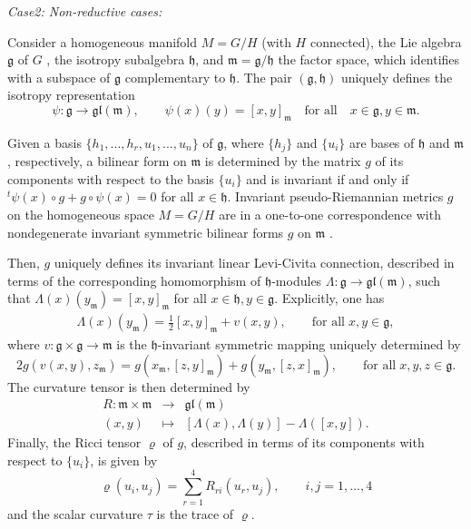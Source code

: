\documentclass[11pt,oneside,leqno]{amsart}
\theoremstyle{plain}
\begin{document}
{\em Case2: Non-reductive cases:}

Consider a homogeneous manifold $M=G/H$ (with $H$ connected), the Lie algebra ${{\mathfrak{g}}}$ of $G$ ,  the isotropy subalgebra ${{\mathfrak{h}}}$, and ${{\mathfrak{m}}} = {{\mathfrak{g}}} /{{\mathfrak{h}}}$ the factor space, which identifies with a subspace of ${{\mathfrak{g}}}$ complementary to ${{\mathfrak{h}}}$. The pair $({{\mathfrak{g}}}, {{\mathfrak{h}}})$ uniquely defines the isotropy representation
$$\psi: {{\mathfrak{g}}} \to \mathfrak{gl}({{\mathfrak{m}}}), \qquad \psi(x)(y) = [x,y]_{{\mathfrak{m}}} \quad \text{for all} \quad x \in {{\mathfrak{g}}}, y \in {{\mathfrak{m}}}.$$

Given a basis $\{h_1, ..., h_r, u_1,...,u_n\}$ of  ${{\mathfrak{g}}}$, where $\{h_j\}$ and $ \{u_i\}$ are bases of ${{\mathfrak{h}}} $ and ${{\mathfrak{m}}}$, respectively, a bilinear form on ${{\mathfrak{m}}}$ is determined by the matrix $g$ of its components with respect to the basis $\{u_i\}$ and  is invariant if and only if $^t \psi(x) \circ g + g \circ \psi(x) = 0$ for all $x \in {{\mathfrak{h}}}$. Invariant pseudo-Riemannian metrics $g$ on the homogeneous space $M=G/H$ are in a one-to-one correspondence with nondegenerate invariant symmetric bilinear forms $g$ on ${{\mathfrak{m}}}$ \cite{K}.

Then, $g$ uniquely defines its invariant linear Levi-Civita connection, described in terms of the corresponding homomorphism of ${{\mathfrak{h}}}$-modules $\Lambda : {{\mathfrak{g}}} \to \mathfrak{gl}({{\mathfrak{m}}})$, such that $\Lambda (x)(y_{{\mathfrak{m}}}) = [x, y]_{{\mathfrak{m}}}$ for all $x\in {{\mathfrak{h}}}, y \in {{\mathfrak{g}}}$. Explicitly, one has
$$\begin{array}{l}
\Lambda (x)(y_{{\mathfrak{m}}}) = \frac{1}{2}[x,y]_{{\mathfrak{m}}} +v(x,y), \qquad \text{for all} \; x,y \in {{\mathfrak{g}}} ,
\end{array}$$
where $v: {{\mathfrak{g}}} \times {{\mathfrak{g}}} \to {{\mathfrak{m}}} $ is the ${{\mathfrak{h}}}$-invariant symmetric mapping uniquely determined by
$$2g (v(x, y), z_{{\mathfrak{m}}}) = g(x_{{\mathfrak{m}}}, [z, y]_{{\mathfrak{m}}}) + g(y_{{\mathfrak{m}}}, [z, x]_{{\mathfrak{m}}}), \qquad \text{for all} \; x, y, z \in {{\mathfrak{g}}}.
$$
The curvature tensor is then determined by
\begin{equation}\label{curv}
\begin{array}{rcl}
R:{{\mathfrak{m}}} \times {{\mathfrak{m}}} & \to & \mathfrak{gl}({{\mathfrak{m}}}) \\[4 pt] (x, y) & \mapsto & [\Lambda(x), \Lambda(y)]-\Lambda([x, y]).
\end{array}
\end{equation}
Finally, the Ricci tensor $\varrho$ of $g$, described in terms of its components with respect to $\{u_i\}$, is given by
\begin{equation}\label{ric}
\varrho (u_i, u_j) = \sum _{r=1} ^4 R_{ri} (u_r,u_j), \qquad i,j=1,...,4
\end{equation}
and the scalar curvature $\tau$ is the trace of $\varrho$.
\end{document}
